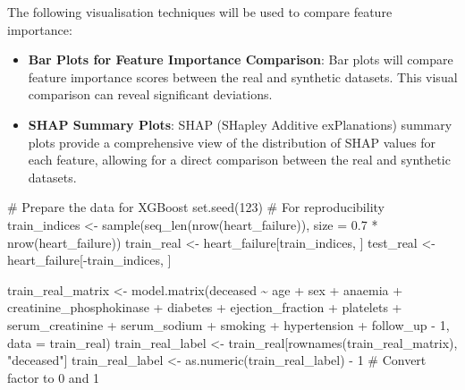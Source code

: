 \documentclass[
  letterpaper,
  DIV=11,
  numbers=noendperiod]{scrartcl}
\newenvironment{Shaded}{\begin{snugshade}}{\end{snugshade}}
\newcommand{\AttributeTok}[1]{\textcolor[rgb]{0.40,0.45,0.13}{#1}}
\newcommand{\CommentTok}[1]{\textcolor[rgb]{0.37,0.37,0.37}{#1}}
\newcommand{\DecValTok}[1]{\textcolor[rgb]{0.68,0.00,0.00}{#1}}
\newcommand{\FloatTok}[1]{\textcolor[rgb]{0.68,0.00,0.00}{#1}}
\newcommand{\FunctionTok}[1]{\textcolor[rgb]{0.28,0.35,0.67}{#1}}
\newcommand{\NormalTok}[1]{\textcolor[rgb]{0.00,0.23,0.31}{#1}}
\newcommand{\OtherTok}[1]{\textcolor[rgb]{0.00,0.23,0.31}{#1}}
\newcommand{\SpecialCharTok}[1]{\textcolor[rgb]{0.37,0.37,0.37}{#1}}
\newcommand{\StringTok}[1]{\textcolor[rgb]{0.13,0.47,0.30}{#1}}
\providecommand{\tightlist}{%
  \setlength{\itemsep}{0pt}\setlength{\parskip}{0pt}}\usepackage{longtable,booktabs,array}
\begin{document}
The following visualisation techniques will be used to compare feature
importance:

\begin{itemize}
\tightlist
\item
  \textbf{Bar Plots for Feature Importance Comparison}: Bar plots will
  compare feature importance scores between the real and synthetic
  datasets. This visual comparison can reveal significant deviations.
\item
  \textbf{SHAP Summary Plots}: SHAP (SHapley Additive exPlanations)
  summary plots provide a comprehensive view of the distribution of SHAP
  values for each feature, allowing for a direct comparison between the
  real and synthetic datasets.
\end{itemize}

\begin{Shaded}
\begin{Highlighting}[]
\CommentTok{\# Prepare the data for XGBoost}
\FunctionTok{set.seed}\NormalTok{(}\DecValTok{123}\NormalTok{)  }\CommentTok{\# For reproducibility}
\NormalTok{train\_indices }\OtherTok{\textless{}{-}} \FunctionTok{sample}\NormalTok{(}\FunctionTok{seq\_len}\NormalTok{(}\FunctionTok{nrow}\NormalTok{(heart\_failure)), }\AttributeTok{size =} \FloatTok{0.7} \SpecialCharTok{*} \FunctionTok{nrow}\NormalTok{(heart\_failure))}
\NormalTok{train\_real }\OtherTok{\textless{}{-}}\NormalTok{ heart\_failure[train\_indices, ]}
\NormalTok{test\_real }\OtherTok{\textless{}{-}}\NormalTok{ heart\_failure[}\SpecialCharTok{{-}}\NormalTok{train\_indices, ]}

\NormalTok{train\_real\_matrix }\OtherTok{\textless{}{-}} \FunctionTok{model.matrix}\NormalTok{(deceased }\SpecialCharTok{\textasciitilde{}}\NormalTok{ age }\SpecialCharTok{+}\NormalTok{ sex }\SpecialCharTok{+}\NormalTok{ anaemia }\SpecialCharTok{+}\NormalTok{ creatinine\_phosphokinase }\SpecialCharTok{+}\NormalTok{ diabetes }\SpecialCharTok{+}\NormalTok{ ejection\_fraction }\SpecialCharTok{+}\NormalTok{ platelets }\SpecialCharTok{+}\NormalTok{ serum\_creatinine }\SpecialCharTok{+}\NormalTok{ serum\_sodium }\SpecialCharTok{+}\NormalTok{ smoking }\SpecialCharTok{+}\NormalTok{ hypertension }\SpecialCharTok{+}\NormalTok{ follow\_up }\SpecialCharTok{{-}} \DecValTok{1}\NormalTok{, }\AttributeTok{data =}\NormalTok{ train\_real)}
\NormalTok{train\_real\_label }\OtherTok{\textless{}{-}}\NormalTok{ train\_real[}\FunctionTok{rownames}\NormalTok{(train\_real\_matrix), }\StringTok{"deceased"}\NormalTok{]}
\NormalTok{train\_real\_label }\OtherTok{\textless{}{-}} \FunctionTok{as.numeric}\NormalTok{(train\_real\_label) }\SpecialCharTok{{-}} \DecValTok{1}  \CommentTok{\# Convert factor to 0 and 1}


\end{Highlighting}
\end{Shaded}
\end{document}
